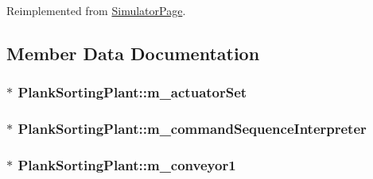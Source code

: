 Reimplemented from \hyperlink{classSimulatorPage_ac478dc8792d0f593c6dc6277a4e96719}{Simulator\-Page}.



\subsection{Member Data Documentation}
\hypertarget{classPlankSortingPlant_ab6c83de131a92e26c4b007a64d84dcfe}{
\subsubsection[{m\-\_\-actuator\-Set}]{$\ast$ Plank\-Sorting\-Plant\-::m\-\_\-actuator\-Set\hspace{0.3cm}{\ttfamily [private]}}}\label{classPlankSortingPlant_ab6c83de131a92e26c4b007a64d84dcfe}
\hypertarget{classPlankSortingPlant_ab4428fbbce9a7023848de19be0525156}{
\subsubsection[{m\-\_\-command\-Sequence\-Interpreter}]{$\ast$ Plank\-Sorting\-Plant\-::m\-\_\-command\-Sequence\-Interpreter\hspace{0.3cm}{\ttfamily [private]}}}\label{classPlankSortingPlant_ab4428fbbce9a7023848de19be0525156}
\hypertarget{classPlankSortingPlant_ad5ba935847d141b8dc9842e369b8fa75}{
\subsubsection[{m\-\_\-conveyor1}]{$\ast$ Plank\-Sorting\-Plant\-::m\-\_\-conveyor1\hspace{0.3cm}{\ttfamily [private]}}}\label{classPlankSortingPlant_ad5ba935847d141b8dc9842e369b8fa75}
